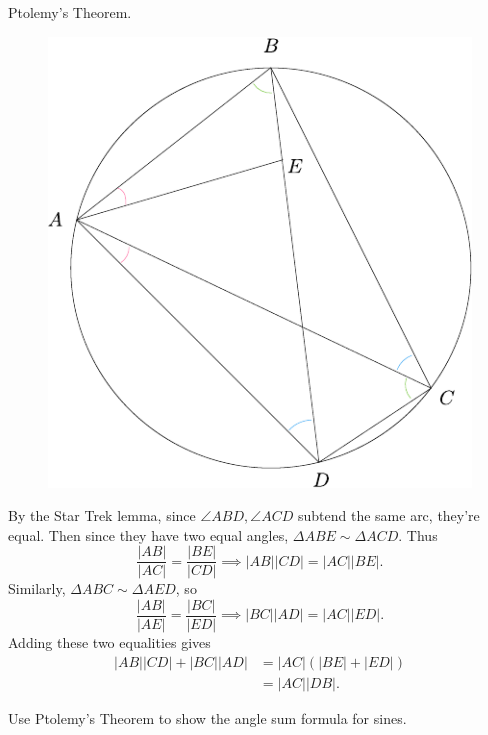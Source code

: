 \documentclass[twoside,10pt]{article}
\begin{document}

\begin{exer}[1.109]
Ptolemy's Theorem.
\end{exer}

\begin{figure}[H]
	\centering
	\includegraphics[scale=1]{fig/109.pdf}
\end{figure}

By the Star Trek lemma, since $\angle ABD, \angle ACD$ subtend the same arc, they're equal. Then since they have two equal angles, $\Delta ABE \sim \Delta ACD$. Thus
\[
\frac{|AB|}{|AC|} = \frac{|BE|}{|CD|} \implies |AB| |CD| = |AC| |BE|.
\] Similarly, $\Delta ABC \sim \Delta AED$, so
\[
\frac{|AB|}{|AE|} = \frac{|BC|}{|ED|} \implies |BC| |AD| = |AC| |ED|.
\] Adding these two equalities gives
\begin{align*}
	|AB| |CD| + |BC| |AD| &= |AC| (|BE| + |ED|) \\
			      &= |AC| |DB|.
\end{align*}

\newpage

\begin{exer}[1.111]
Use Ptolemy's Theorem to show the angle sum formula for sines.
\end{exer}
\end{document}

